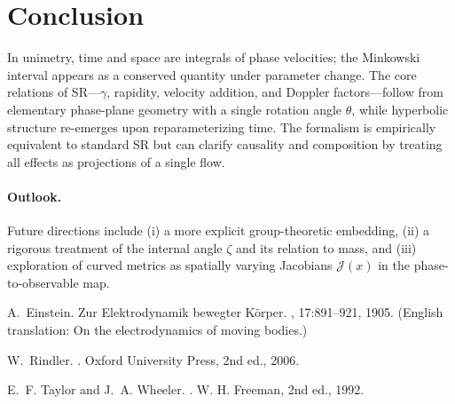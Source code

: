 \documentclass[11pt]{article}
\numberwithin{equation}{section}
\begin{document}
\section{Conclusion}
In unimetry, time and space are integrals of phase velocities; the Minkowski interval appears as a conserved quantity under parameter change. The core relations of SR---$\gamma$, rapidity, velocity addition, and Doppler factors---follow from elementary phase-plane geometry with a single rotation angle $\theta$, while hyperbolic structure re-emerges upon reparameterizing time. The formalism is empirically equivalent to standard SR but can clarify causality and composition by treating all effects as projections of a single flow.

\paragraph{Outlook.} Future directions include (i) a more explicit group-theoretic embedding, (ii) a rigorous treatment of the internal angle $\zeta$ and its relation to mass, and (iii) exploration of curved metrics as spatially varying Jacobians $\mathcal{J}(x)$ in the phase-to-observable map.


\begin{thebibliography}{9}

A.~Einstein.
\newblock Zur Elektrodynamik bewegter K\"{o}rper.
, 17:891--921, 1905.
(English translation: On the electrodynamics of moving bodies.)

W.~Rindler.
.
\newblock Oxford University Press, 2nd ed., 2006.

E.~F. Taylor and J.~A. Wheeler.
.
\newblock W. H. Freeman, 2nd ed., 1992.

\end{thebibliography}
\end{document}
